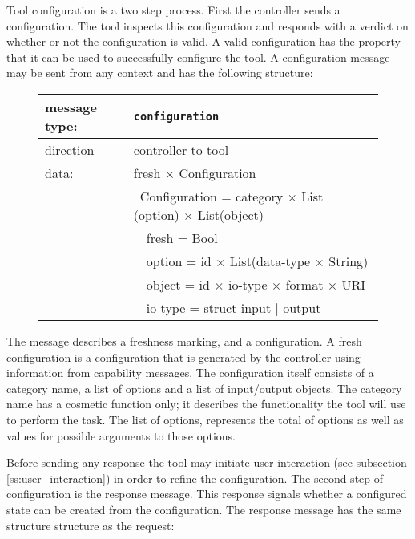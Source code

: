 \documentclass{article}
\newcommand{\msg}[1]{\texttt{#1}}
\begin{document}
   Tool configuration is a two step process. First the controller sends a
   configuration. The tool inspects this configuration and responds with a
   verdict on whether or not the configuration is valid. A valid configuration
   has the property that it can be used to successfully configure the tool. A
   configuration message may be sent from any context and has the following
   structure:

   \begin{figure}[H]
    \begin{center}
     \begin{tabular}{|ll|}
      \hline
       message type:   & \msg{configuration} \\
      \hline
       direction       & controller to tool \\
       data:           & fresh $\times$ Configuration \\
                       & \ Configuration = category $\times$ List (option) $\times$ List(object) \\
                       & \ \ fresh   = Bool \\
                       & \ \ option  = id $\times$ List(data-type $\times$ String) \\
                       & \ \ object  = id $\times$ io-type $\times$ format $\times$ URI \\
                       & \ \ io-type = struct input $|$ output \\
      \hline
     \end{tabular}
    \end{center}
   \end{figure}

   \noindent The message describes a freshness marking, and a configuration. A
   fresh configuration is a configuration that is generated by the controller
   using information from capability messages. The configuration itself
   consists of a category name, a list of options and a list of input/output
   objects. The category name has a cosmetic function only; it describes the
   functionality the tool will use to perform the task. The list of options,
   represents the total of options as well as values for possible arguments to
   those options.

   Before sending any response the tool may initiate user interaction (see
   subsection \ref{ss:user_interaction}) in order to refine the configuration.
   The second step of configuration is the response message. This response
   signals whether a configured state can be created from the configuration.
   The response message has the same structure structure as the request:
\end{document}
